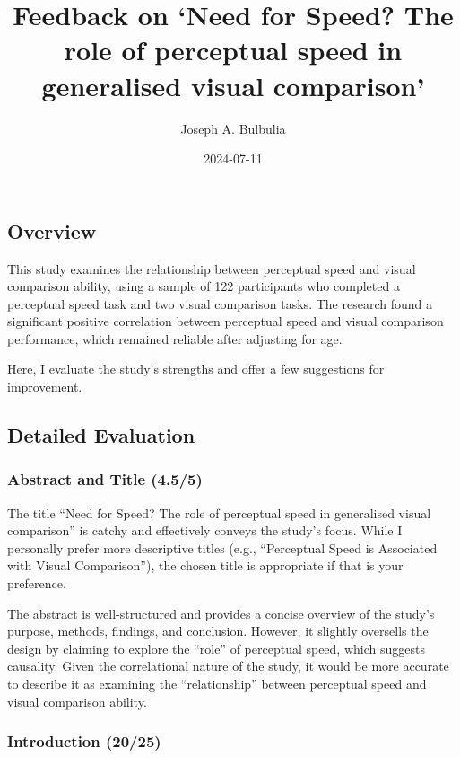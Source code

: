 \documentclass[
  single column]{article}
\title{Feedback on `Need for Speed? The role of perceptual speed in
generalised visual comparison'}
\author{Joseph A. Bulbulia}
\affil{%
             \small{     Victoria University of Wellington, New Zealand
          ORCID \textcolor[HTML]{A6CE39}{\aiOrcid} ~0000-0002-5861-2056 }
              }
\date{2024-07-11}
\begin{document}
\maketitle

\subsection{Overview}\label{overview}

This study examines the relationship between perceptual speed and visual
comparison ability, using a sample of 122 participants who completed a
perceptual speed task and two visual comparison tasks. The research
found a significant positive correlation between perceptual speed and
visual comparison performance, which remained reliable after adjusting
for age.

Here, I evaluate the study's strengths and offer a few suggestions for
improvement.

\subsection{Detailed Evaluation}\label{detailed-evaluation}

\subsubsection{Abstract and Title
(4.5/5)}\label{abstract-and-title-4.55}

The title ``Need for Speed? The role of perceptual speed in generalised
visual comparison'' is catchy and effectively conveys the study's focus.
While I personally prefer more descriptive titles (e.g., ``Perceptual
Speed is Associated with Visual Comparison''), the chosen title is
appropriate if that is your preference.

The abstract is well-structured and provides a concise overview of the
study's purpose, methods, findings, and conclusion. However, it slightly
oversells the design by claiming to explore the ``role'' of perceptual
speed, which suggests causality. Given the correlational nature of the
study, it would be more accurate to describe it as examining the
``relationship'' between perceptual speed and visual comparison ability.

\subsubsection{Introduction (20/25)}\label{introduction-2025}
\end{document}
